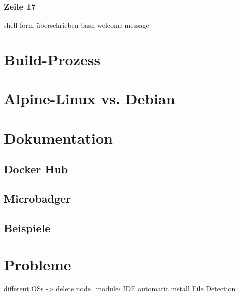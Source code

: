 \subsubsection {Zeile 17}
shell form
überschrieben
bash
welcome message



\section{Build-Prozess}
\label{sec:build-process}


\section{Alpine-Linux vs. Debian}
\label{sec:alpine-vs-debian}


\section{Dokumentation}
\label{sec:documentation}

\subsection{Docker Hub}
\label{sub:dockerhub}
\subsection{Microbadger}
\label{sub:microbadger}
\subsection{Beispiele}
\label{sub:examples}


\section{Probleme}
\label{sec:container-problems}
different OSs -> delete node_modules
IDE automatic install
File Detection
